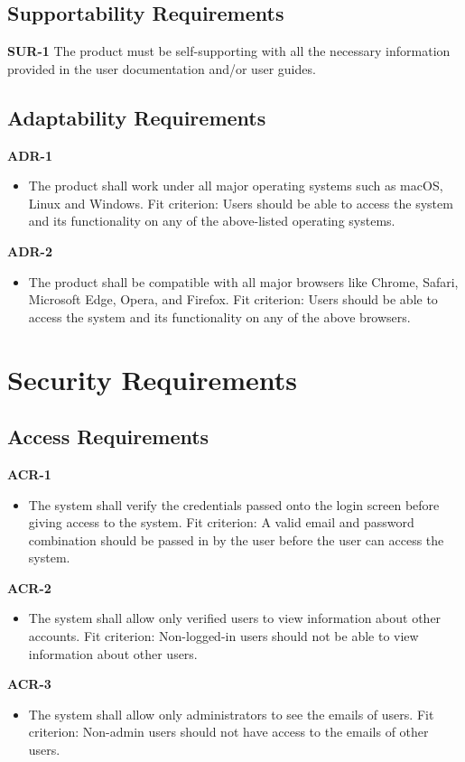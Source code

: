 \documentclass[12pt]{article}
\begin{document}
\subsection{Supportability Requirements}
\textbf{SUR-1}
The product must be self-supporting with all the necessary information provided in the user documentation and/or user guides.

\subsection{Adaptability Requirements}
\textbf{ADR-1}
\begin{itemize}
    \item The product shall work under all major operating systems such as macOS, Linux and Windows. \hfill \break
    Fit criterion: Users should be able to access the system and its functionality on any of the above-listed operating systems.
\end{itemize}
\textbf{ADR-2}
\begin{itemize}
    \item The product shall be compatible with all major browsers like Chrome, Safari, Microsoft Edge, Opera, and Firefox. \hfill \break
    Fit criterion: Users should be able to access the system and its functionality on any of the above browsers.
\end{itemize}


\section{Security Requirements}
\subsection{Access Requirements}
\textbf{ACR-1}
\begin{itemize}
    \item The system shall verify the credentials passed onto the login screen before giving access to the system. \hfill \break
    Fit criterion: A valid email and password combination should be passed in by the user before the user can access the system.
\end{itemize}
\textbf{ACR-2}
\begin{itemize}
    \item The system shall allow only verified users to view information about other accounts. \hfill \break
    Fit criterion: Non-logged-in users should not be able to view information about other users.
\end{itemize}
\textbf{ACR-3}
\begin{itemize}
    \item The system shall allow only administrators to see the emails of users. \hfill \break
    Fit criterion: Non-admin users should not have access to the emails of other users.
\end{itemize}
\end{document}
